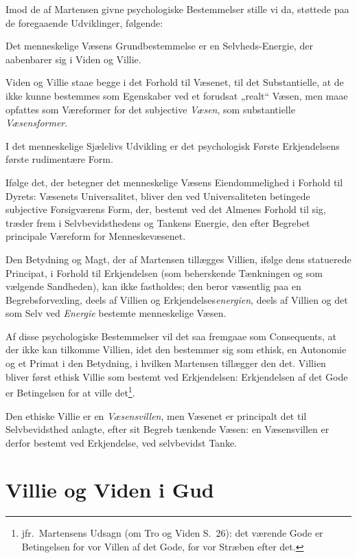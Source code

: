 \documentclass[12pt,a4paper]{book}
\newcommand{\opage}[1]{\marginnote{\footnotesize\textit{[#1]}}}
\begin{document}
Imod de af Martensen givne psychologiske Bestemmelser stille vi da, støttede paa
de foregaaende Udviklinger, følgende:

Det menneskelige Væsens Grundbestemmelse er en Selvheds-Energie, der aabenbarer
sig i Viden og Villie.

Viden og Villie staae begge i det Forhold til Væsenet, til det Substantielle, at
de ikke kunne bestemmes som Egenskaber ved et forudsat „realt“ Væsen, men maae
opfattes som Væreformer for det subjective \emph{Væsen}, som substantielle \emph{Væsensformer}.

I det menneskelige Sjælelivs Udvikling er det psychologisk Første Erkjendelsens
første rudimentære Form.

Ifølge det, der betegner det menneskelige Væsens Eiendommelighed i Forhold til
Dyrets: Væsenets Universalitet, bliver den ved Universaliteten betingede subjective
Forsigværens Form, der, bestemt ved det Almenes Forhold til sig, træder frem i
Selvbevidsthedens og Tankens Energie, den efter Begrebet principale Væreform for
Menneskevæsenet.

Den Betydning og Magt, der af Martensen tillægges Villien, ifølge dens statuerede
Principat, i Forhold til Erkjendelsen (som beherskende Tænkningen og som vælgende
Sandheden), kan ikke fastholdes; den beror væsentlig paa en Begrebsforvexling,
deels af Villien og Erkjendelses\emph{energien}, deels af Villien og det som Selv ved \emph{Energie} bestemte menneskelige Væsen.

Af disse psychologiske Bestemmelser vil det saa fremgaae som Consequents, at der
ikke kan tilkomme Villien, idet den bestemmer sig som ethisk, en Autonomie og et
Primat i den Betydning, i hvilken Martensen tillægger den det. Villien bliver
først ethisk Villie som bestemt ved Erkjendelsen: Erkjendelsen af det Gode er
Betingelsen for at ville det\footnote{jfr.\ Martensens Udsagn (om Tro og Viden S.\
26): det værende Gode er Betingelsen for vor Villen af det Gode, for vor Stræben
efter det.}.

\opage{56}Den ethiske Villie er en \emph{Væsensvillen}, men Væsenet er principalt det til
Selvbevidsthed anlagte, efter sit Begreb tænkende Væsen: en Væsensvillen er derfor
bestemt ved Erkjendelse, ved selvbevidst Tanke.

\section{Villie og Viden i Gud}
\label{sec:villie-gud}
\end{document}
